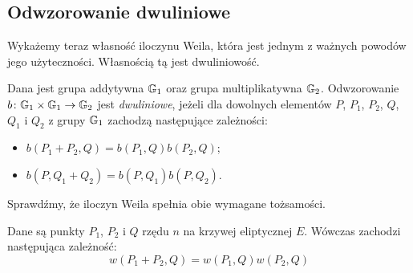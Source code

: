 \subsection*{Odwzorowanie dwuliniowe}

\noindent
Wykażemy teraz własność iloczynu Weila,
która jest jednym z ważnych powodów jego użyteczności.
Własnością tą jest dwuliniowość.

\begin{definition}
Dana jest grupa addytywna $\mathbb{G}_1$ oraz grupa multiplikatywna $\mathbb{G}_2$.
Odwzorowanie $b\colon \mathbb{G}_1 \times \mathbb{G}_1 \to \mathbb{G}_2$
jest \emph{dwuliniowe},
jeżeli dla dowolnych elementów
$P$, $P_1$, $P_2$, $Q$, $Q_1$ i $Q_2$ z grupy $\mathbb{G}_1$
zachodzą następujące zależności:
\begin{itemize}
\item $b(P_1 + P_2, Q) = b(P_1, Q)b(P_2, Q)$;
\item $b(P, Q_1 + Q_2) = b(P, Q_1)b(P, Q_2)$.
\end{itemize}
\end{definition}

\noindent
Sprawdźmy, że iloczyn Weila spełnia obie wymagane tożsamości.

\begin{lemma}
Dane są punkty $P_1$, $P_2$ i $Q$ rzędu $n$ na krzywej eliptycznej $E$.
Wówczas zachodzi następująca zależność:
\begin{equation}
w(P_1 + P_2, Q) = w(P_1, Q)w(P_2, Q)
\end{equation}
\end{lemma}


